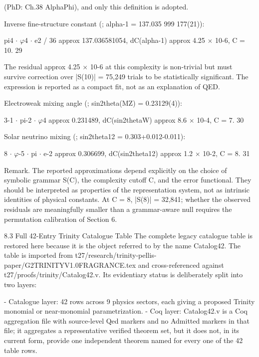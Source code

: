   (PhD: Ch.38 AlphaPhi), and only this definition is adopted.

  Inverse fine-structure constant (\citealp{codata2022}; alpha-1 = 137.035 999 177(21)):

  pi4 $\cdot$ $\varphi$4 $\cdot$ e2 / 36 approx 137.036581054, dC(alpha-1) approx 4.25 $\times$ 10-6, C = 10. 29

  The residual approx 4.25 $\times$ 10-6 at this complexity is non-trivial but must survive
  correction over |S(10)| = 75{,}249 trials to be statistically significant. The expression is
  reported as a compact fit, not as an explanation of QED.

  Electroweak mixing angle (\citealp{pdg2024}; sin2theta(MZ) = 0.23129(4)):

  3-1 $\cdot$ pi-2 $\cdot$ $\varphi$4 approx 0.231489, dC(sin2thetaW) approx 8.6 $\times$ 10-4, C = 7. 30

  Solar neutrino mixing (\citealp{pdg2024}; sin2theta12 = 0.303+0.012-0.011):

  8 $\cdot$ $\varphi$-5 $\cdot$ pi $\cdot$ e-2 approx 0.306699, dC(sin2theta12) approx 1.2 $\times$ 10-2, C = 8. 31

        Remark. The reported approximations depend explicitly on the choice of symbolic
        grammar S(C), the complexity cutoff C, and the error functional. They should be
        interpreted as properties of the representation system, not as intrinsic identities
        of physical constants. At C = 8, |S(8)| = 32{,}841; whether the observed residuals
        are meaningfully smaller than a grammar-aware null requires the permutation
        calibration of Section 6.

  8.3 Full 42-Entry Trinity Catalogue Table
  The complete legacy catalogue table is restored here because it is the object referred to
  by     the      name        Catalog42.     The      table     is     imported       from
  t27/research/trinity-pellis-paper/G2TRINITYV1.0FRAGRANCE.tex and cross-referenced
  against t27/proofs/trinity/Catalog42.v. Its evidentiary status is deliberately split into
  two layers:

  - Catalogue layer: 42 rows across 9 physics sectors, each giving a proposed Trinity
  monomial or near-monomial parametrization.
  - Coq layer: Catalog42.v is a Coq aggregation file with source-level Qed markers and no
  Admitted markers in that file; it aggregates a representative verified theorem set, but it
  does not, in its current form, provide one independent theorem named for every one of
  the 42 table rows.

